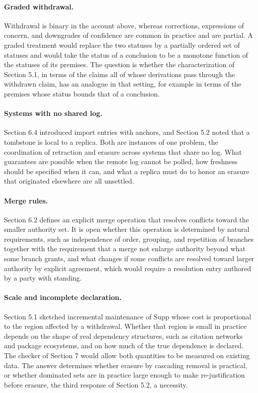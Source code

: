 \documentclass[11pt]{article}
\theoremstyle{plain}
\theoremstyle{definition}
\theoremstyle{remark}
\begin{document}
\paragraph{Graded withdrawal.} Withdrawal is binary in the account above, whereas corrections, expressions of concern, and downgrades of confidence are common in practice and are partial. A graded treatment would replace the two statuses by a partially ordered set of statuses and would take the status of a conclusion to be a monotone function of the statuses of its premises. The question is whether the characterization of Section 5.1, in terms of the claims all of whose derivations pass through the withdrawn claim, has an analogue in that setting, for example in terms of the premises whose status bounds that of a conclusion.

\paragraph{Systems with no shared log.} Section 6.4 introduced import entries with anchors, and Section 5.2 noted that a tombstone is local to a replica. Both are instances of one problem, the coordination of retraction and erasure across systems that share no log. What guarantees are possible when the remote log cannot be polled, how freshness should be specified when it can, and what a replica must do to honor an erasure that originated elsewhere are all unsettled.

\paragraph{Merge rules.} Section 6.2 defines an explicit merge operation that resolves conflicts toward the smaller authority set. It is open whether this operation is determined by natural requirements, such as independence of order, grouping, and repetition of branches together with the requirement that a merge not enlarge authority beyond what some branch grants, and what changes if some conflicts are resolved toward larger authority by explicit agreement, which would require a resolution entry authored by a party with standing.

\paragraph{Scale and incomplete declaration.} Section 5.1 sketched incremental maintenance of $\mathrm{Supp}$ whose cost is proportional to the region affected by a withdrawal. Whether that region is small in practice depends on the shape of real dependency structures, such as citation networks and package ecosystems, and on how much of the true dependence is declared. The checker of Section 7 would allow both quantities to be measured on existing data. The answer determines whether erasure by cascading removal is practical, or whether dominated sets are in practice large enough to make re-justification before erasure, the third response of Section 5.2, a necessity.
\end{document}
